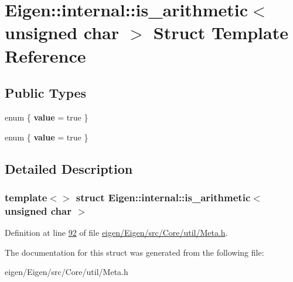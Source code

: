 \hypertarget{struct_eigen_1_1internal_1_1is__arithmetic_3_01unsigned_01char_01_4}{}\section{Eigen\+:\+:internal\+:\+:is\+\_\+arithmetic$<$ unsigned char $>$ Struct Template Reference}
\label{struct_eigen_1_1internal_1_1is__arithmetic_3_01unsigned_01char_01_4}
\subsection*{Public Types}
\begin{DoxyCompactItemize}
\item 
\mbox{\label{struct_eigen_1_1internal_1_1is__arithmetic_3_01unsigned_01char_01_4_acffcb9bd7db4789e3b6e92052451c374}} 
enum \{ {\bfseries value} = true
 \}
\item 
\mbox{\label{struct_eigen_1_1internal_1_1is__arithmetic_3_01unsigned_01char_01_4_a7ce5c606ee8c78a12d0f729b7acf4524}} 
enum \{ {\bfseries value} = true
 \}
\end{DoxyCompactItemize}


\subsection{Detailed Description}
\subsubsection*{template$<$$>$\newline
struct Eigen\+::internal\+::is\+\_\+arithmetic$<$ unsigned char $>$}



Definition at line \hyperlink{eigen_2_eigen_2src_2_core_2util_2_meta_8h_source_l00092}{92} of file \hyperlink{eigen_2_eigen_2src_2_core_2util_2_meta_8h_source}{eigen/\+Eigen/src/\+Core/util/\+Meta.\+h}.



The documentation for this struct was generated from the following file\+:\begin{DoxyCompactItemize}
\item 
eigen/\+Eigen/src/\+Core/util/\+Meta.\+h\end{DoxyCompactItemize}

